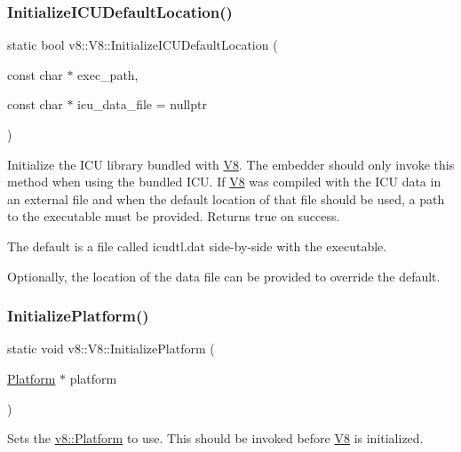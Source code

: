 \subsubsection{\texorpdfstring{Initialize\+I\+C\+U\+Default\+Location()}{InitializeICUDefaultLocation()}}
{\footnotesize\ttfamily static bool v8\+::\+V8\+::\+Initialize\+I\+C\+U\+Default\+Location (\begin{DoxyParamCaption}\item[{const char $\ast$}]{exec\+\_\+path,  }\item[{const char $\ast$}]{icu\+\_\+data\+\_\+file = {\ttfamily nullptr} }\end{DoxyParamCaption})\hspace{0.3cm}{\ttfamily [static]}}

Initialize the I\+CU library bundled with \mbox{\hyperlink{classv8_1_1V8}{V8}}. The embedder should only invoke this method when using the bundled I\+CU. If \mbox{\hyperlink{classv8_1_1V8}{V8}} was compiled with the I\+CU data in an external file and when the default location of that file should be used, a path to the executable must be provided. Returns true on success.

The default is a file called icudtl.\+dat side-\/by-\/side with the executable.

Optionally, the location of the data file can be provided to override the default. \mbox{\label{classv8_1_1V8_a095eb8064458588a579c2b904e02dbbf}} 
\subsubsection{\texorpdfstring{Initialize\+Platform()}{InitializePlatform()}}
{\footnotesize\ttfamily static void v8\+::\+V8\+::\+Initialize\+Platform (\begin{DoxyParamCaption}\item[{\mbox{\hyperlink{classv8_1_1Platform}{Platform}} $\ast$}]{platform }\end{DoxyParamCaption})\hspace{0.3cm}{\ttfamily [static]}}

Sets the \mbox{\hyperlink{classv8_1_1Platform}{v8\+::\+Platform}} to use. This should be invoked before \mbox{\hyperlink{classv8_1_1V8}{V8}} is initialized. \mbox{\label{classv8_1_1V8_a5cbe8372ea21fcf6ae816e090e9a2d1f}} 

